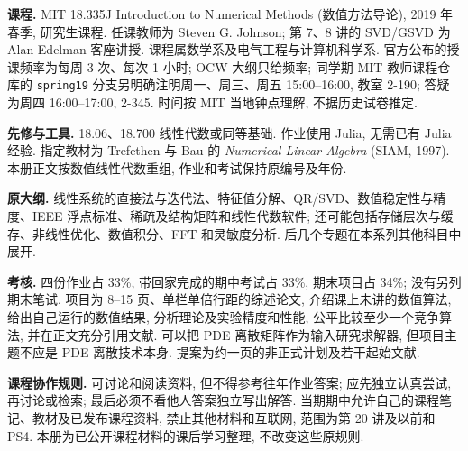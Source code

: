 \par
{}
\par
\textbf{课程.} MIT 18.335J Introduction to Numerical Methods (数值方法导论), 2019 年春季, 研究生课程. 任课教师为 Steven G. Johnson; 第 7、8 讲的 SVD/GSVD 为 Alan Edelman 客座讲授. 课程属数学系及电气工程与计算机科学系. 官方公布的授课频率为每周 3 次、每次 1 小时; OCW 大纲只给频率; 同学期 MIT 教师课程仓库的 \texttt{spring19} 分支另明确注明周一、周三、周五 15:00--16:00, 教室 2-190; 答疑为周四 16:00--17:00, 2-345. 时间按 MIT 当地钟点理解, 不据历史试卷推定.

\textbf{先修与工具.} 18.06、18.700 线性代数或同等基础. 作业使用 Julia, 无需已有 Julia 经验. 指定教材为 Trefethen 与 Bau 的 \emph{Numerical Linear Algebra} (SIAM, 1997). 本册正文按数值线性代数重组, 作业和考试保持原编号及年份.

\textbf{原大纲.} 线性系统的直接法与迭代法、特征值分解、QR/SVD、数值稳定性与精度、IEEE 浮点标准、稀疏及结构矩阵和线性代数软件; 还可能包括存储层次与缓存、非线性优化、数值积分、FFT 和灵敏度分析. 后几个专题在本系列其他科目中展开.

\textbf{考核.} 四份作业占 33\%, 带回家完成的期中考试占 33\%, 期末项目占 34\%; 没有另列期末笔试. 项目为 8--15 页、单栏单倍行距的综述论文, 介绍课上未讲的数值算法, 给出自己运行的数值结果, 分析理论及实验精度和性能, 公平比较至少一个竞争算法, 并在正文充分引用文献. 可以把 PDE 离散矩阵作为输入研究求解器, 但项目主题不应是 PDE 离散技术本身. 提案为约一页的非正式计划及若干起始文献.

\textbf{课程协作规则.} 可讨论和阅读资料, 但不得参考往年作业答案; 应先独立认真尝试, 再讨论或检索; 最后必须不看他人答案独立写出解答. 当期期中允许自己的课程笔记、教材及已发布课程资料, 禁止其他材料和互联网, 范围为第 20 讲及以前和 PS4. 本册为已公开课程材料的课后学习整理, 不改变这些原规则.

